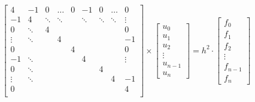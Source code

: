 
\begin{equation}
  \begin{bmatrix}
    4 & -1      & 0 & \ldots & 0 & -1 & 0 & \ldots & 0 \\
    -1 & 4 & \ddots & \ddots & & \ddots & \ddots & \ddots & \vdots \\
    0 & \ddots      & 4 & & & & & & 0 \\
    \vdots & \ddots & & 4 & & & & & -1 \\
    0 &       & & & 4 & & & & 0 \\
    -1 & \ddots     & & & & 4 & & & \vdots \\
    0 & \ddots      & & & & & 4 & & \\
    \vdots & \ddots & & & & & & 4 & -1 \\
    0 &       & & & & & & & 4 \\
  \end{bmatrix}
  \times
  \begin{bmatrix}
    u_0 \\ u_1 \\ u_2 \\ \vdots \\ u_{n-1} \\ u_n
  \end{bmatrix}
  =
  h^2 \cdot
  \begin{bmatrix}
    f_0 \\ f_1 \\ f_2 \\ \vdots \\ f_{n-1} \\ f_n
  \end{bmatrix}
\end{equation}

